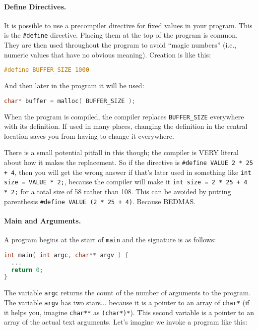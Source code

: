 \paragraph{Define Directives.}

It is possible to use a precompiler directive for fixed values in your program. This is the \texttt{\#define} directive. Placing them at the top of the program is common. They are then used throughout the program to avoid ``magic numbers'' (i.e., numeric values that have no obvious meaning). Creation is like this:

\begin{lstlisting}[language=C]
#define BUFFER_SIZE 1000
\end{lstlisting}

And then later in the program it will be used:

\begin{lstlisting}[language=C]
char* buffer = malloc( BUFFER_SIZE );
\end{lstlisting}

When the program is compiled, the compiler replaces \texttt{BUFFER\_SIZE} everywhere with its definition. If used in many places, changing the definition in the central location saves you from having to change it everywhere.

There is a small potential pitfall in this though; the compiler is VERY literal about how it makes the replacement. So if the directive is \texttt{\#define VALUE 2 * 25 + 4}, then you will get the wrong answer if that's later used in something like \texttt{int size = VALUE * 2;}, because the compiler will make it \texttt{int size = 2 * 25 + 4 * 2;} for a total size of 58 rather than 108. This can be avoided by putting parenthesis \texttt{\#define VALUE (2 * 25 + 4)}. Because BEDMAS.

\paragraph{Main and Arguments.}
A program begins at the start of \texttt{main} and the signature is as follows:

\begin{lstlisting}[language=C]
int main( int argc, char** argv ) {
  ...
  return 0;
}
\end{lstlisting}

The variable \texttt{argc} returns the count of the number of arguments to the program. The variable \texttt{argv} has two stars... because it is a pointer to an array of \texttt{char*} (if it helps you, imagine \texttt{char**} as \texttt{(char*)*}). This second variable is a pointer to an array of the actual text arguments. Let's imagine we invoke a program like this:

